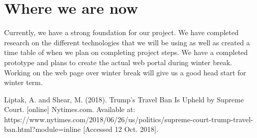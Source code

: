\documentclass[onecolumn, draftclsnofoot,10pt, compsoc]{IEEEtran}
\begin{document}
\section{Where we are now}
        Currently, we have a strong foundation for our project.
        We have completed research on the different technologies that we will be using as well as created a time table of when we plan on completing project steps.
        We have a completed prototype and plans to create the actual web portal during winter break. 
        Working on the web page over winter break will give us a good head start for winter term.
\begin{thebibliography}{1}

 Liptak, A. and Shear, M. (2018). Trump’s Travel Ban Is Upheld by Supreme Court. [online] Nytimes.com. Available at: https://www.nytimes.com/2018/06/26/us/politics/supreme-court-trump-travel-ban.html?module=inline [Accessed 12 Oct. 2018].

\end{thebibliography}
\end{document}
